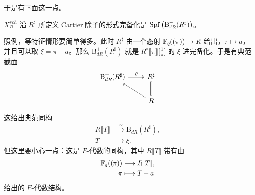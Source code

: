 于是有下面这一点。

\begin{proposition}\label{prop:1.33}
$X^{sch}_R$ 沿 $R^\sharp$ 所定义 Cartier 除子的形式完备化是 $\operatorname{Spf}\big(\mathrm{B}^{+}_{dR}(R^\sharp)\big)$。
\end{proposition}

照例，等特征情形要简单得多。此时 $R^\sharp$ 由一个态射 $\mathbb{F}_q((\pi))\to R$ 给出，$\pi\mapsto a$，并且可以取 $\xi=\pi-a$。那么 $\mathrm{B}^{+}_{dR}(R^\sharp)$ 就是 $R^\circ\llbracket\pi\rrbracket\big[\frac{1}{\pi}\big]$ 的 $\xi$-进完备化。于是有典范截面
\[
\begin{tikzcd}
\mathrm{B}^{+}_{dR}(R^\sharp)\arrow[r,two heads,"\theta"] & R^\sharp\\
& R\arrow[ul]\arrow[u,equal]
\end{tikzcd}
\]

\leavevmode{}这给出典范同构
\[
\begin{aligned}
R\llbracket T\rrbracket&\xrightarrow{\ \sim\ }\mathrm{B}^{+}_{dR}(R^\sharp),\\
T&\longmapsto\xi .
\end{aligned}
\]
但这里要小心一点：这是 $E$-代数的同构，其中 $R\llbracket T\rrbracket$ 带有由
\[
\begin{aligned}
\mathbb{F}_q((\pi))&\longrightarrow R\llbracket T\rrbracket,\\
\pi&\longmapsto T+a
\end{aligned}
\]
给出的 $E$-代数结构。

